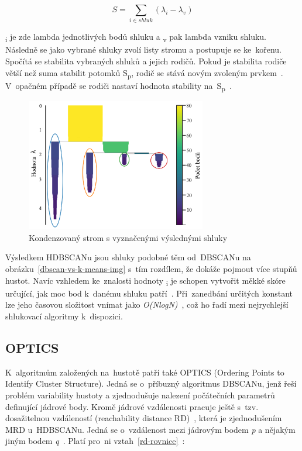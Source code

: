 \begin{equation}
\label{stabilita-rovnice}
S = \sum_{i\in shluk}(\lambda_i - \lambda_{v})
\end{equation}

\textlambda\textsubscript{i} je zde lambda jednotlivých bodů shluku a \textlambda\textsubscript{v} pak lambda vzniku shluku. Následně se jako vybrané shluky zvolí listy stromu a postupuje se ke~kořenu. Spočítá se stabilita vybraných shluků a jejich rodičů. Pokud je stabilita rodiče větší než suma stabilit potomků S\textsubscript{p}, rodič se stává novým zvoleným prvkem~\cite{hdbscan}. V~opačném případě se rodiči nastaví hodnota stability na~S\textsubscript{p}~\cite{hdbscan}.

\begin{figure}[hbt]
	\centering
	\includegraphics[width=0.7\textwidth]{obrazky/hdbscan-condensed-tree.pdf}
	\caption{Kondenzovaný strom s vyznačenými výslednými shluky}
	\label{hdbscan-result-img}
\end{figure}

Výsledkem HDBSCANu jsou shluky podobné těm od~DBSCANu na obrázku~\ref{dbscan-vs-k-means-img} s~tím rozdílem, že dokáže pojmout více stupňů hustot. Navíc vzhledem ke~znalosti hodnoty \textlambda\textsubscript{i} je schopen vytvořit měkké skóre určující, jak moc bod k~danému shluku patří~\cite{hdbscan}. Při~zanedbání určitých konstant lze jeho časovou složitost vnímat jako \emph{O(NlogN)}~\cite{hdbscan-video}, což ho řadí mezi nejrychlejší shlukovací algoritmy k~dispozici.

\subsection{OPTICS}
K~algoritmům založených na~hustotě patří také OPTICS (Ordering Points to Identify Cluster Structure). Jedná se o~příbuzný algoritmus DBSCANu, jenž řeší problém variability hustoty a zjednodušuje nalezení počátečních parametrů definující jádrové body. Kromě jádrové vzdálenosti \textepsilon\space pracuje ještě s~tzv. dosažitelnou vzdáleností (reachability distance RD)~\cite{optics}, která je zjednodušením MRD u~HDBSCANu. Jedná se o~vzdálenost mezi jádrovým bodem \emph{p} a nějakým jiným bodem \emph{q}~\cite{optics}. Platí pro~ni vztah~\ref{rd-rovnice}~\cite{optics}:

